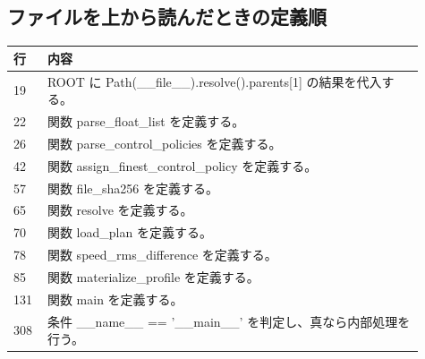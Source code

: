\documentclass[a4paper,11pt]{article}
\begin{document}
        \subsection{ファイルを上から読んだときの定義順}
            \begin{longtable}{p{0.07\linewidth} p{0.84\linewidth}}
            \toprule
            行 & 内容 \\
            \midrule
            19 & ROOT に Path(\_\_file\_\_).resolve().parents[1] の結果を代入する。 \\
22 & 関数 parse\_float\_list を定義する。 \\
26 & 関数 parse\_control\_policies を定義する。 \\
42 & 関数 assign\_finest\_control\_policy を定義する。 \\
57 & 関数 file\_sha256 を定義する。 \\
65 & 関数 resolve を定義する。 \\
70 & 関数 load\_plan を定義する。 \\
78 & 関数 speed\_rms\_difference を定義する。 \\
85 & 関数 materialize\_profile を定義する。 \\
131 & 関数 main を定義する。 \\
308 & 条件 \_\_name\_\_ == '\_\_main\_\_' を判定し、真なら内部処理を行う。 \\
            \bottomrule
            \end{longtable}
\end{document}

